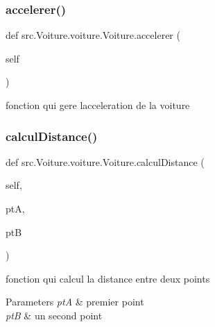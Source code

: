 \subsubsection{\texorpdfstring{accelerer()}{accelerer()}}
{\footnotesize\ttfamily def src.\+Voiture.\+voiture.\+Voiture.\+accelerer (\begin{DoxyParamCaption}\item[{}]{self }\end{DoxyParamCaption})}



fonction qui gere l\textquotesingle{}acceleration de la voiture 

\mbox{\label{classsrc_1_1_voiture_1_1voiture_1_1_voiture_a4dad4941537e1670a824a91e7bcde38d}} 
\subsubsection{\texorpdfstring{calcul\+Distance()}{calculDistance()}}
{\footnotesize\ttfamily def src.\+Voiture.\+voiture.\+Voiture.\+calcul\+Distance (\begin{DoxyParamCaption}\item[{}]{self,  }\item[{}]{ptA,  }\item[{}]{ptB }\end{DoxyParamCaption})}



fonction qui calcul la distance entre deux points 


\begin{DoxyParams}{Parameters}
{\em ptA} & premier point \\
\hline
{\em ptB} & un second point \\
\hline
\end{DoxyParams}
\mbox{\label{classsrc_1_1_voiture_1_1voiture_1_1_voiture_a4d2b74b448d16d053ac5908fa8598885}} 

